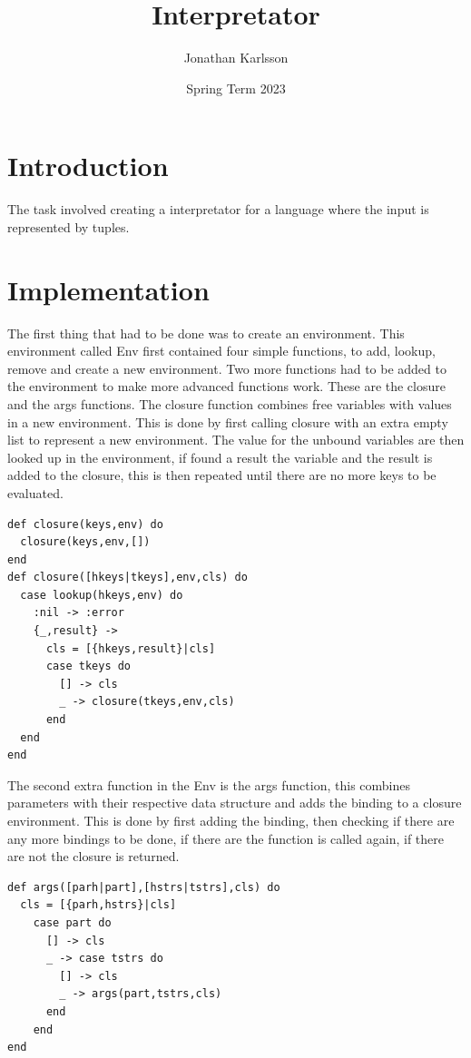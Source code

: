 \documentclass[a4paper,11pt]{article}
\begin{document}
\title{
    \textbf{Interpretator}
}
\author{Jonathan Karlsson}
\date{Spring Term 2023}

\maketitle

\section*{Introduction}
The task involved creating a interpretator for a language where the input is represented by tuples.

\section*{Implementation}
The first thing that had to be done was to create an environment. This environment called Env first contained four simple functions, to add, lookup, remove and create a new environment. Two more functions had to be added to the environment to make more advanced functions work. 
These are the closure and the args functions. The closure function combines free variables with values in a new environment. This is done 
by first calling closure with an extra empty list to represent a new environment. The value for the unbound variables are then looked up in the environment, if found a result the variable and the result is added to the closure, this is then repeated until there are no more keys to be evaluated. 
\begin{verbatim}
def closure(keys,env) do
  closure(keys,env,[])
end
def closure([hkeys|tkeys],env,cls) do
  case lookup(hkeys,env) do
    :nil -> :error
    {_,result} ->
      cls = [{hkeys,result}|cls]
      case tkeys do
        [] -> cls
        _ -> closure(tkeys,env,cls)
      end
  end
end
\end{verbatim}
The second extra function in the Env is the args function, this combines parameters with their respective data structure and adds the binding to a closure environment. This is done by first adding the binding, then checking if there are any more bindings to be done, if there are the function is called again, if there are not the closure is returned.
\begin{verbatim}
def args([parh|part],[hstrs|tstrs],cls) do
  cls = [{parh,hstrs}|cls]
    case part do
      [] -> cls
      _ -> case tstrs do
        [] -> cls
        _ -> args(part,tstrs,cls)
      end
    end
end
\end{verbatim}
\end{document}
